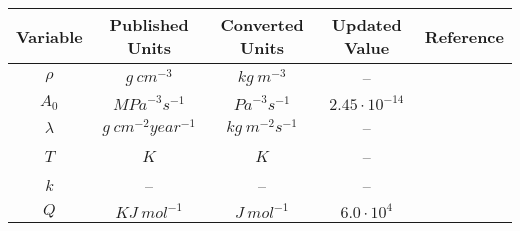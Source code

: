 \documentclass[a4paper,11pt]{article}
\begin{document}
\centering
\begin{longtable}{|c|c|c|c|c|}
\hline
Variable & Published Units & Converted Units & Updated Value & Reference \\
\hline
\begin{math}\rho\end{math} &
\begin{math}g \: cm^{-3}\end{math} &
\begin{math}kg \: m^{-3}\end{math} &
-- & \\
\cline{1-4}
\begin{math}A_0\end{math} &
\begin{math}{MPa}^{-3}s^{-1}\end{math} &
\begin{math}{Pa}^{-3}s^{-1}\end{math} &
\begin{math} 2.45 \cdot 10^{-14} \end{math} & \\
\cline{1-4}
\begin{math} \lambda \end{math} &
\begin{math} g \: {cm}^{-2} year^{-1} \end{math} &
\begin{math} kg \: m^{-2} s^{-1} \end{math} &
-- & \\
\cline{1-4}
\begin{math} T \end{math} &
\begin{math} K \end{math} &
\begin{math} K \end{math} &
-- & \\
\cline{1-4}
\begin{math} k \end{math} &
-- &
-- &
-- & \\
\cline{1-4}
\begin{math} Q \end{math} &
\begin{math} KJ \: {mol}^{-1} \end{math} &
\begin{math} J \: {mol}^{-1} \end{math} &
\begin{math} 6.0 \cdot 10^4 \end{math} & \\

\end{longtable}
\end{document}

